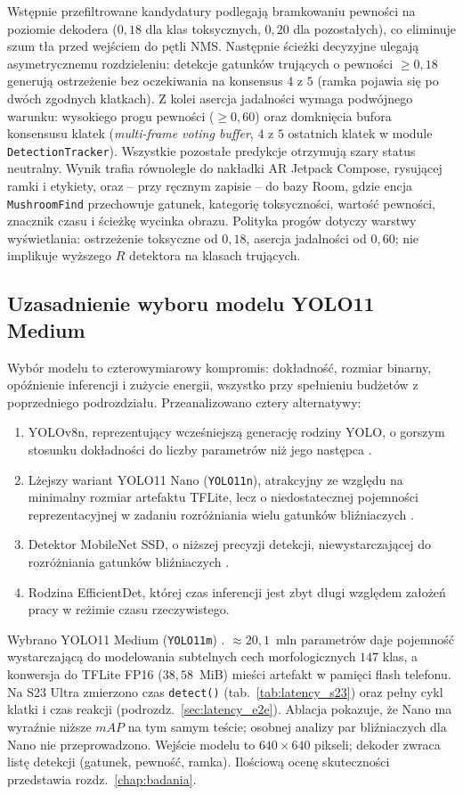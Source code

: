 Wstępnie przefiltrowane kandydatury podlegają bramkowaniu pewności na poziomie dekodera ($0{,}18$ dla klas toksycznych, $0{,}20$ dla pozostałych), co eliminuje szum tła przed wejściem do pętli NMS. Następnie ścieżki decyzyjne ulegają asymetrycznemu rozdzieleniu: detekcje gatunków trujących o pewności $\ge 0{,}18$ generują ostrzeżenie bez oczekiwania na konsensus $4$ z $5$ (ramka pojawia się po dwóch zgodnych klatkach). Z kolei asercja jadalności wymaga podwójnego warunku: wysokiego progu pewności ($\ge 0{,}60$) oraz domknięcia bufora konsensusu klatek (\textit{multi-frame voting buffer}, $4$ z $5$ ostatnich klatek w module \texttt{DetectionTracker}). Wszystkie pozostałe predykcje otrzymują szary status neutralny. Wynik trafia równolegle do nakładki AR Jetpack Compose, rysującej ramki i etykiety, oraz – przy ręcznym zapisie – do bazy Room, gdzie encja \texttt{MushroomFind} przechowuje gatunek, kategorię toksyczności, wartość pewności, znacznik czasu i ścieżkę wycinka obrazu. Polityka progów dotyczy warstwy wyświetlania: ostrzeżenie toksyczne od $0{,}18$, asercja jadalności od $0{,}60$; nie implikuje wyższego $R$ detektora na klasach trujących.

\subsection{Uzasadnienie wyboru modelu YOLO11 Medium}
Wybór modelu to czterowymiarowy kompromis: dokładność, rozmiar binarny, opóźnienie inferencji i zużycie energii, wszystko przy spełnieniu budżetów z poprzedniego podrozdziału. Przeanalizowano cztery alternatywy:
\begin{enumerate}
 \item YOLOv8n, reprezentujący wcześniejszą generację rodziny YOLO, o gorszym stosunku dokładności do liczby parametrów niż jego następca \cite{ultralytics2023yolov8}.
 \item Lżejszy wariant YOLO11 Nano (\texttt{YOLO11n}), atrakcyjny ze względu na minimalny rozmiar artefaktu TFLite, lecz o niedostatecznej pojemności reprezentacyjnej w zadaniu rozróżniania wielu gatunków bliźniaczych \cite{ultralytics2024yolo11}.
 \item Detektor MobileNet SSD, o niższej precyzji detekcji, niewystarczającej do rozróżniania gatunków bliźniaczych \cite{liu2016ssd}.
 \item Rodzina EfficientDet, której czas inferencji jest zbyt długi względem założeń pracy w reżimie czasu rzeczywistego.
\end{enumerate}
Wybrano YOLO11 Medium (\texttt{YOLO11m}) \cite{ultralytics2024yolo11}. $\approx20{,}1$~mln parametrów daje pojemność wystarczającą do modelowania subtelnych cech morfologicznych $147$ klas, a konwersja do TFLite FP16 ($38{,}58$~MiB) mieści artefakt w pamięci flash telefonu. Na S23 Ultra zmierzono czas \texttt{detect()} (tab.~\ref{tab:latency_s23}) oraz pełny cykl klatki i czas reakcji (podrozdz.~\ref{sec:latency_e2e}). Ablacja pokazuje, że Nano ma wyraźnie niższe $mAP$ na tym samym teście; osobnej analizy par bliźniaczych dla Nano nie przeprowadzono. Wejście modelu to $640\times640$ pikseli; dekoder zwraca listę detekcji (gatunek, pewność, ramka). Ilościową ocenę skuteczności przedstawia rozdz.~\ref{chap:badania}.


